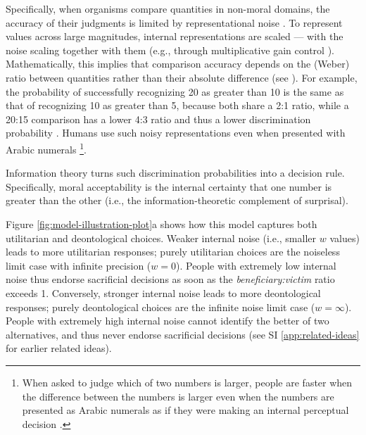 \documentclass[
]{article}
\begin{document}
Specifically, when organisms compare quantities in non-moral domains, the accuracy of their judgments is limited by representational noise \autocite{BarrettoGarcia2023,Cicchini2014,Khaw2020,Lasne2019,Izard2008,Halberda2008}. To represent values across large magnitudes, internal representations are scaled --- with the noise scaling together with them (e.g., through multiplicative gain control \autocite{Abbott1997,Levi1969,Rudd1997,Priebe2002,Salinas2000,Willmore2014}). Mathematically, this implies that comparison accuracy depends on the (Weber) ratio between quantities rather than their absolute difference (see \autocite{Endress-Catastrophic-Interference,Zhou2024}). For example, the probability of successfully recognizing 20 as greater than 10 is the same as that of recognizing 10 as greater than 5, because both share a 2:1 ratio, while a 20:15 comparison has a lower 4:3 ratio and thus a lower discrimination probability \autocite{Izard2008,Halberda2008}. Humans use such noisy representations even when presented with Arabic numerals \autocite{Moyer1967,Buckley1974,Hinrichs1981,Dehaene1990}\footnote{When asked to judge which of two numbers is larger, people are faster when the difference between the numbers is larger even when the numbers are presented as Arabic numerals as if they were making an internal perceptual decision \autocite{Moyer1967,Buckley1974,Hinrichs1981,Dehaene1990}.}.

Information theory turns such discrimination probabilities into a decision rule. Specifically, moral acceptability is the internal certainty that one number is greater than the other (i.e., the information-theoretic complement of surprisal).

Figure \ref{fig:model-illustration-plot}a shows how this model captures both utilitarian and deontological choices. Weaker internal noise (i.e., smaller \(w\) values) leads to more utilitarian responses; purely utilitarian choices are the noiseless limit case with infinite precision (\(w = 0\)). People with extremely low internal noise thus endorse sacrificial decisions as soon as the \emph{beneficiary:victim} ratio exceeds 1. Conversely, stronger internal noise leads to more deontological responses; purely deontological choices are the infinite noise limit case (\(w = \infty\)). People with extremely high internal noise cannot identify the better of two alternatives, and thus never endorse sacrificial decisions (see SI \ref{app:related-ideas} for earlier related ideas).
\end{document}
